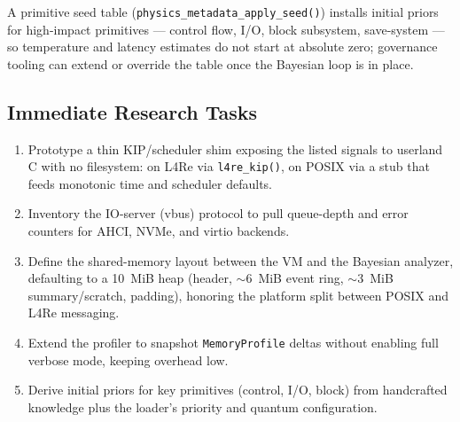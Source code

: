 A primitive seed table (\texttt{physics\_metadata\_apply\_seed()}) installs initial
priors for high-impact primitives --- control flow, I/O, block subsystem, save-system
--- so temperature and latency estimates do not start at absolute zero; governance
tooling can extend or override the table once the Bayesian loop is in place.

\subsection{Immediate Research Tasks}

\begin{enumerate}
  \item Prototype a thin KIP/scheduler shim exposing the listed signals to userland C
        with no filesystem: on L4Re via \texttt{l4re\_kip()}, on POSIX via a stub that
        feeds monotonic time and scheduler defaults.
  \item Inventory the IO-server (vbus) protocol to pull queue-depth and error counters
        for AHCI, NVMe, and virtio backends.
  \item Define the shared-memory layout between the VM and the Bayesian analyzer,
        defaulting to a 10~MiB heap (header, $\sim$6~MiB event ring, $\sim$3~MiB
        summary/scratch, padding), honoring the platform split between POSIX and L4Re
        messaging.
  \item Extend the profiler to snapshot \texttt{MemoryProfile} deltas without enabling
        full verbose mode, keeping overhead low.
  \item Derive initial priors for key primitives (control, I/O, block) from handcrafted
        knowledge plus the loader's priority and quantum configuration.
\end{enumerate}

